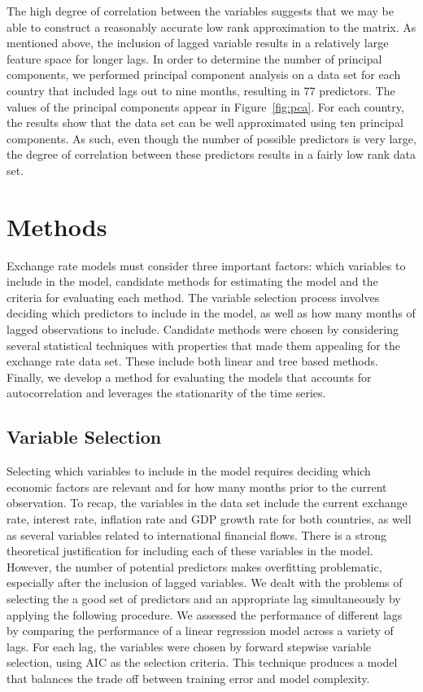 \documentclass{sig-alternate-05-2015}
\begin{document}
The high degree of correlation between the variables suggests that we may be able to construct a reasonably accurate low rank approximation to the matrix. As mentioned above, the inclusion of lagged variable results in a relatively large feature space for longer lags. In order to determine the number of principal components, we performed principal component analysis on a data set for each country that included lags out to nine months, resulting in 77 predictors. The values of the principal components appear in Figure~\ref{fig:pca}. For each country, the results show that the data set can be well approximated using ten principal components. As such, even though the number of possible predictors is very large, the degree of correlation between these predictors results in a fairly low rank data set.

\section{Methods}
Exchange rate models must consider three important factors: which variables to include in the model, candidate methods for estimating the model and the criteria for evaluating each method. The variable selection process involves deciding which predictors to include in the model, as well as how many months of lagged observations to include. Candidate methods were chosen by considering several statistical techniques with properties that made them appealing for the exchange rate data set. These include both linear and tree based methods. Finally, we develop a method for evaluating the models that accounts for autocorrelation and leverages the stationarity of the time series.

\subsection{Variable Selection}
Selecting which variables to include in the model requires deciding which economic factors are relevant and for how many months prior to the current observation. To recap, the variables in the data set include the current exchange rate, interest rate, inflation rate and GDP growth rate for both countries, as well as several variables related to international financial flows. There is a strong theoretical justification for including each of these variables in the model. However, the number of potential predictors makes overfitting problematic, especially after the inclusion of lagged variables. We dealt with the problems of selecting the a good set of predictors and an appropriate lag simultaneously by applying the following procedure. We assessed the performance of different lags by comparing the performance of a linear regression model across a variety of lags. For each lag, the variables were chosen by forward stepwise variable selection, using AIC as the selection criteria. This technique produces a model that balances the trade off between training error and model complexity.
\end{document}
